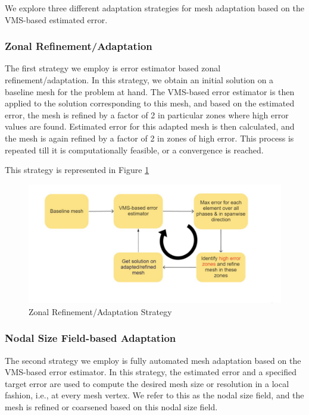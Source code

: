 We explore three different adaptation strategies for mesh adaptation based on the VMS-based estimated error. 

\subsubsection{Zonal Refinement/Adaptation}

The first strategy we employ is error estimator based zonal refinement/adaptation. 
In this strategy, we obtain an initial solution on a baseline mesh for the problem at hand. The VMS-based error estimator is then applied to the solution corresponding to this mesh, and based on the estimated error, the mesh is refined by a factor of 2 in particular zones where high error values are found. Estimated error for this adapted mesh is then calculated, and the mesh is again refined by a factor of 2 in zones of high error. This process is repeated till it is computationally feasible, or a convergence is reached.

This strategy is represented in Figure \ref{fig:zonal_based_strat}

\begin{figure}[H]
	\centering
	\includegraphics[width=1\textwidth]{figures/adapt_strat/zonal_based.png}
	\caption{Zonal Refinement/Adaptation Strategy}
	\label{fig:zonal_based_strat}
\end{figure}

\subsubsection{Nodal Size Field-based Adaptation}

The second strategy we employ is fully automated mesh adaptation based on the VMS-based error estimator. In this strategy, the estimated error and a specified target error are used to compute the desired mesh size or resolution in a local fashion, i.e., at every mesh vertex. We refer to this as the nodal size field, and the mesh is refined or coarsened based on this nodal size field. 

